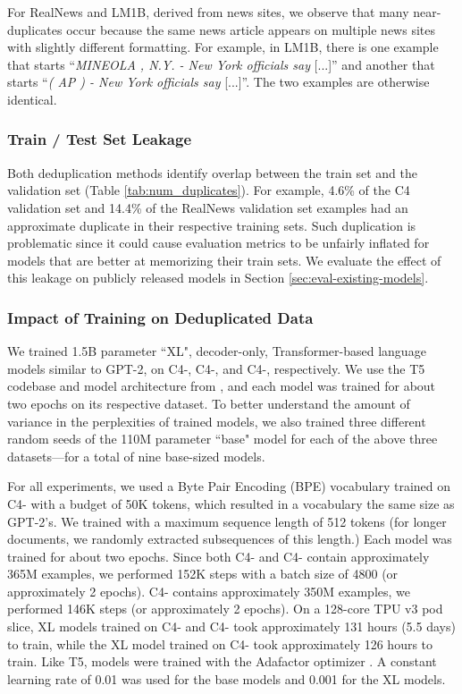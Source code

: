 For RealNews and LM1B, derived from news sites, we observe that many near-duplicates occur because the same news article appears on multiple news sites with slightly different formatting.
For example, in LM1B, there is one example that starts ``\textit{MINEOLA , N.Y. - New York officials say} [...]'' and another that starts ``\textit{( AP ) - New York officials say} [...]''.
The two examples are otherwise identical.

\subsubsection{Train / Test Set Leakage}
\label{sec:leakage}
Both deduplication methods identify overlap between the train set and the validation set (Table \ref{tab:num_duplicates}).
For example, 4.6\% of the C4 validation set and 14.4\% of the RealNews validation set examples had an approximate duplicate in their respective training sets.
Such duplication is problematic since it could cause evaluation metrics to be unfairly inflated for models that are better at memorizing their train sets.
We evaluate the effect of this leakage on publicly released models in Section \ref{sec:eval-existing-models}.

\subsubsection{Impact of Training on Deduplicated Data}
\label{sec:impact-trained-models}
We trained 1.5B parameter ``XL", decoder-only, Transformer-based language models similar to GPT-2, on C4-\Original, C4-\Approx, and C4-\Exact, respectively.
We use the T5 codebase and model architecture from \citet{raffel2019exploring}, and each model was trained for about two epochs on its respective dataset.
To better understand the amount of variance in the perplexities of trained models, we also trained three different random seeds of the 110M parameter ``base" model for each of the above three datasets---for a total of nine base-sized models.

For all experiments, we used a Byte Pair Encoding (BPE) vocabulary trained on C4-\Approx{} with a budget of 50K tokens, which resulted in a vocabulary the same size as GPT-2's.
We trained with a maximum sequence length of 512 tokens (for longer documents, we randomly extracted subsequences of this length.)
Each model was trained for about two epochs.
Since both C4-\Original{} and C4-\Exact{} contain approximately 365M examples, we performed 152K steps with a batch size of 4800 (or approximately 2 epochs). 
C4-\Approx{} contains approximately 350M examples, we performed 146K steps (or approximately 2 epochs).
On a 128-core TPU v3 pod slice, XL models trained on C4-\Original{} and C4-\Exact{} took approximately 131 hours (5.5 days) to train, while the XL model trained on C4-\Approx{} took approximately 126 hours to train.
Like T5, models were trained with the Adafactor optimizer \citep{shazeer2018adafactor}. A constant learning rate of 0.01 was used for the base models and 0.001 for the XL models.

